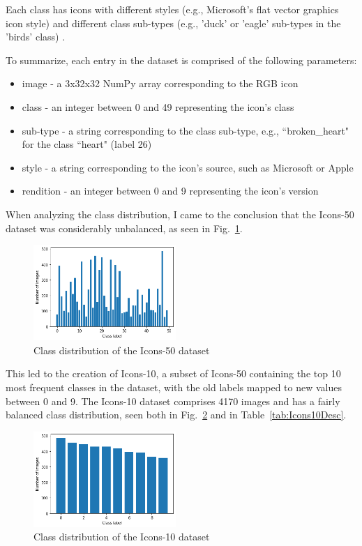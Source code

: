 \documentclass[conference]{IEEEtran}
\begin{document}
Each class has icons with different styles (e.g., Microsoft's flat vector graphics icon style) and different class sub-types (e.g., 'duck' or 'eagle' sub-types in the 'birds' class) \cite{Icons50}.

To summarize, each entry in the dataset is comprised of the following parameters:
\begin{itemize}
    \item image - a 3x32x32 NumPy array corresponding to the RGB icon
    \item class - an integer between 0 and 49 representing the icon's class
    \item sub-type - a string corresponding to the class sub-type, e.g., ``broken\_heart" for the class ``heart" (label 26)
    \item style - a string corresponding to the icon's source, such as Microsoft or Apple
    \item rendition - an integer between 0 and 9 representing the icon's version
\end{itemize}

When analyzing the class distribution, I came to the conclusion that the Icons-50 dataset was considerably unbalanced, as seen in Fig.~\ref{fig:Icons50ClassDist}.

\begin{figure}[htbp]
    \centering
    \includegraphics[width=0.48\textwidth]{paper/images/icons50/class_dist.png}
    \caption{Class distribution of the Icons-50 dataset}
    \label{fig:Icons50ClassDist}
\end{figure}

This led to the creation of Icons-10, a subset of Icons-50 containing the top 10 most frequent classes in the dataset, with the old labels mapped to new values between 0 and 9. The Icons-10 dataset comprises 4170 images and has a fairly balanced class distribution, seen both in Fig.~\ref{fig:Icons10ClassDist} and in Table~\ref{tab:Icons10Desc}.

\begin{figure}[htbp]
    \centering
    \includegraphics[width=0.48\textwidth]{paper/images/icons10/class_dist.png}
    \caption{Class distribution of the Icons-10 dataset}
    \label{fig:Icons10ClassDist}
\end{figure}
\end{document}
